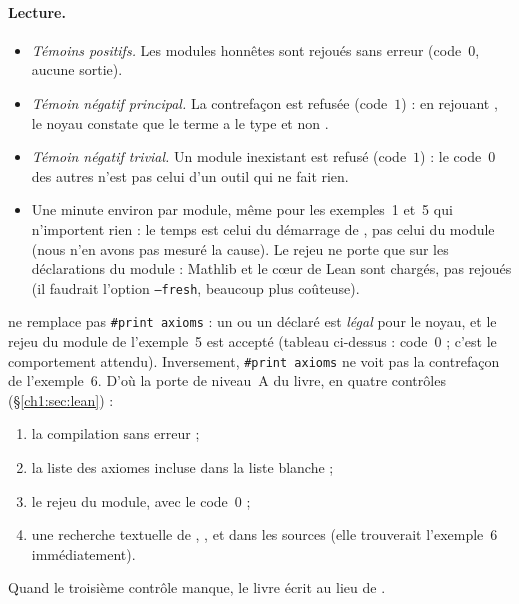 \paragraph{Lecture.}
\begin{itemize}
\item \emph{Témoins positifs.} Les modules honnêtes sont rejoués sans erreur (code~$0$, aucune sortie).
\item \emph{Témoin négatif principal.} La contrefaçon est refusée (code~$1$) : en rejouant , le noyau
constate que le terme  a le type  et non .
\item \emph{Témoin négatif trivial.} Un module inexistant est refusé (code~$1$) : le code~$0$ des autres n'est pas
celui d'un outil qui ne fait rien.
\item Une minute environ par module, même pour les exemples~1 et~5 qui n'importent rien : le temps est celui du démarrage de
, pas celui du module (nous n'en avons pas mesuré la cause). Le rejeu ne porte que sur les déclarations du module : Mathlib et le cœur de Lean sont chargés,
pas rejoués (il faudrait l'option \texttt{--fresh}, beaucoup plus coûteuse).
\end{itemize}

\begin{warnbox}
 ne remplace pas \texttt{\#print axioms} : un  ou un  déclaré est
\emph{légal} pour le noyau, et le rejeu du module de l'exemple~5 est accepté (tableau ci-dessus : code~$0$ ; c'est le comportement attendu). Inversement, \texttt{\#print axioms} ne voit pas la contrefaçon de l'exemple~6.
D'où la porte de niveau~A du livre, en quatre contrôles (§\ref{ch1:sec:lean}) :
\begin{enumerate}
\item la compilation sans erreur ;
\item la liste des axiomes incluse dans la liste blanche ;
\item le rejeu  du module, avec le code~$0$ ;
\item une recherche textuelle de , ,  et 
dans les sources (elle trouverait l'exemple~6 immédiatement).
\end{enumerate}
Quand le troisième contrôle manque, le livre écrit \tierAs{} au lieu de \tierA.
\end{warnbox}

